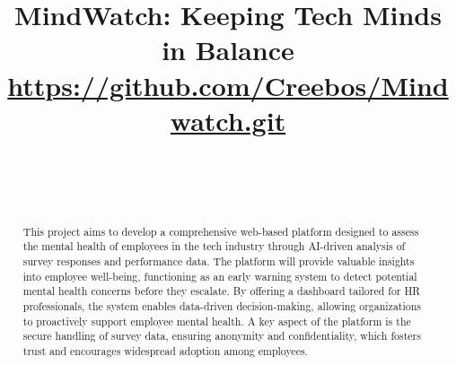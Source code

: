 \documentclass[conference]{IEEEtran}
\begin{document}
    \title{
        MindWatch: Keeping Tech Minds in Balance\\
        {
            \footnotesize \textsuperscript{} \href{https://github.com/Creebos/Mindwatch.git}{https://github.com/Creebos/Mindwatch.git}
        }
    }
    
    \author {
        \\
        
        
        \and
    
        \\
    
    }
    
    \maketitle
    
    \begin{abstract}
        This project aims to develop a comprehensive web-based
        platform designed to assess the mental health of employees in
        the tech industry through AI-driven analysis of survey
        responses and performance data. The platform will provide
        valuable insights into employee well-being, functioning as an
        early warning system to detect potential mental health concerns
        before they escalate. By offering a dashboard tailored for HR
        professionals, the system enables data-driven decision-making,
        allowing organizations to proactively support employee mental
        health. A key aspect of the platform is the secure handling of
        survey data, ensuring anonymity and confidentiality, which
        fosters trust and encourages widespread adoption among
        employees.
    \end{abstract}
    
\end{document}
